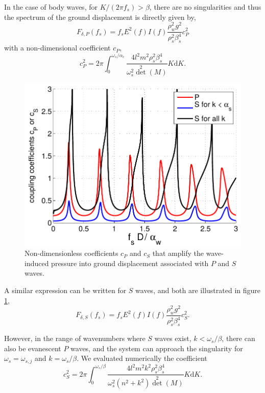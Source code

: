 In the case of body waves, for $K/(2 \pi f_s) > \beta$, there are no singularities and thus the spectrum of the ground displacement is directly given by, 
\begin{equation}
F_{\delta,P}(f_s)= f_s   E^2(f)I(f)  \frac{\rho_w^2 g^2}{\rho_s^2 \beta_s^4 } c_P^2 
\label{eq:P_source}
\end{equation}
with a non-dimensional coefficient $c_{P}$,
\begin{equation}
 c_P^2=2 \pi \int_0^{\omega_s/\alpha_c} 
\frac{4 l^2 m^2 \rho_s^2 \beta_s^4}{\omega_s^2 \det^2 (M)} K {\mathrm d} K \label{c_P_def}.
\end{equation}


\begin{figure}[htb]
\centerline{\includegraphics[width=0.7\linewidth]{FIGS_CH_SISMO/cp_cs.pdf}}
  \caption{Non-dimensionless coefficients  $c_P$ and $c_S$ that amplify the wave-induced pressure into ground displacement
associated with $P$ and $S$ waves.}
\label{fig:sismo_coefPS}
\end{figure}
A similar expression can be written for $S$ waves, and both are illustrated in 
figure  \ref{fig:sismo_coefPS}, 
\begin{equation}
F_{\delta,S}(f_s)= f_s   E^2(f)I(f)   \frac{\rho_w^2 g^2  }{\rho_s^2 \beta_s^4 } c_S^2.
\label{eq:S_source}
\end{equation}

 However, in the range of wavenumbers 
where $S$ waves exist, $k < \omega_s/\beta$, there can also be evanescent $P$ waves, and the system can approach the 
singularity for $\omega_s=\omega_{s,j}$ and $k=\omega_s/\beta$. We evaluated numerically the coefficient 
\begin{equation}
 c_S^2=2 \pi \int_0^{\omega_s/\beta} 
\frac{4 l^2 m^2 k^2 \rho_s^2 \beta_s^4}{\omega_s^2 (n^2+k^2)\det^2 (M)} K {\mathrm d} K.
\end{equation}

